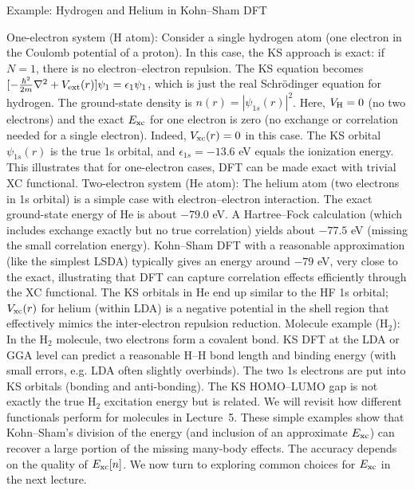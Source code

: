 \begin{frame}{Example: Hydrogen and Helium in Kohn–Sham DFT}

One-electron system (H atom): Consider a single hydrogen atom (one electron in the Coulomb potential of a proton). In this case, the KS approach is exact: if $N=1$, there is no electron–electron repulsion. The KS equation becomes $[-\frac{\hbar^2}{2m}\nabla^2 + V_{\rm ext}(r)]\psi_1 = \epsilon_1 \psi_1$, which is just the real Schrödinger equation for hydrogen. The ground-state density is $n(r)=|\psi_{1s}(r)|^2$. Here, $V_{\rm H}=0$ (no two electrons) and the exact $E_{\rm xc}$ for one electron is zero (no exchange or correlation needed for a single electron). Indeed, $V_{\rm xc}(r)=0$ in this case. The KS orbital $\psi_{1s}(r)$ is the true 1s orbital, and $\epsilon_{1s} = -13.6$ eV equals the ionization energy. This illustrates that for one-electron cases, DFT can be made exact with trivial XC functional.
Two-electron system (He atom): The helium atom (two electrons in 1s orbital) is a simple case with electron–electron interaction. The exact ground-state energy of He is about $-79.0$ eV. A Hartree–Fock calculation (which includes exchange exactly but no true correlation) yields about $-77.5$ eV (missing the small correlation energy). Kohn–Sham DFT with a reasonable approximation (like the simplest LSDA) typically gives an energy around $-79$ eV, very close to the exact, illustrating that DFT can capture correlation effects efficiently through the XC functional. The KS orbitals in He end up similar to the HF 1s orbital; $V_{\rm xc}(r)$ for helium (within LDA) is a negative potential in the shell region that effectively mimics the inter-electron repulsion reduction.
Molecule example (H$_2$): In the H$_2$ molecule, two electrons form a covalent bond. KS DFT at the LDA or GGA level can predict a reasonable H–H bond length and binding energy (with small errors, e.g. LDA often slightly overbinds). The two 1s electrons are put into KS orbitals (bonding and anti-bonding). The KS HOMO–LUMO gap is not exactly the true H$_2$ excitation energy but is related. We will revisit how different functionals perform for molecules in Lecture 5.
These simple examples show that Kohn–Sham’s division of the energy (and inclusion of an approximate $E_{\rm xc}$) can recover a large portion of the missing many-body effects. The accuracy depends on the quality of $E_{\rm xc}[n]$. We now turn to exploring common choices for $E_{\rm xc}$ in the next lecture. \end{frame}


